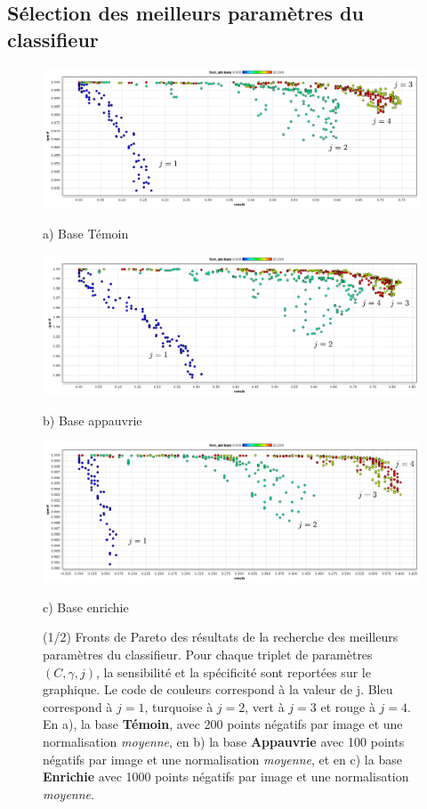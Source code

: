 \subsection{Sélection des meilleurs paramètres du classifieur}
\begin{figure}[h!]
\begin{center}
 \includegraphics[width=14cm]{images/pareto_param_200}

{\small a) Base Témoin}
\vspace{0.5cm}

\includegraphics[width=14cm]{images/pareto_param_100}

{\small b) Base appauvrie}

 \includegraphics[width=14cm]{images/pareto_param_1000}
 
{\small c) Base enrichie}

\end{center}
 \caption[(1/2) Recherche des meilleurs paramètres du classifieurs : Fronts de pareto]{(1/2) Fronts de Pareto des résultats de la recherche des meilleurs paramètres du classifieur. Pour chaque triplet de paramètres $(C, \gamma, j)$, la sensibilité et la spécificité sont reportées sur le graphique. Le code de couleurs correspond à la valeur de j. Bleu correspond à $j=1$, turquoise à $j=2$, vert à $j=3$ et rouge à $j=4$. En a), la base \textbf{Témoin}, avec 200 points négatifs par image et une normalisation \emph{moyenne}, en b) la base \textbf{Appauvrie} avec 100 points négatifs par image et une normalisation \emph{moyenne}, et en c) la base \textbf{Enrichie} avec 1000 points négatifs par image et une normalisation \emph{moyenne}.}
\label{fig:paretoParams1}
\end{figure}



